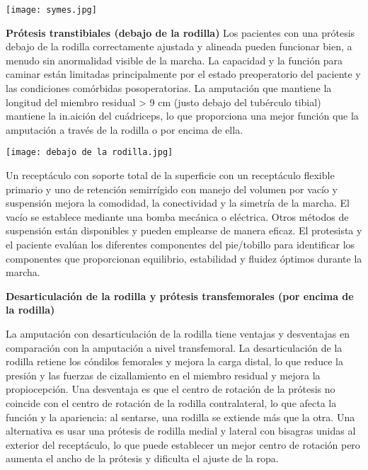 \documentclass{article}
\begin{document}
\begin{minipage}{.89\linewidth}
\centering
\texttt{[image: symes.jpg]}
\end{minipage}


\hspace{1cm}


\textbf {Prótesis transtibiales (debajo de la rodilla) }
Los pacientes con una prótesis debajo de la rodilla correctamente ajustada y alineada pueden funcionar bien, a menudo sin anormalidad visible de la marcha. La capacidad y la función para caminar están limitadas principalmente por el estado preoperatorio del paciente y las condiciones comórbidas posoperatorias. La amputación que mantiene la longitud del miembro residual > 9 cm (justo debajo del tubérculo tibial) mantiene la in.aición del cuádriceps, lo que proporciona una mejor función que la amputación a través de la rodilla o por encima de ella.

\hspace{1cm}


\begin{minipage}{.89\linewidth}
\centering
\texttt{[image: debajo de la rodilla.jpg]}
\end{minipage}

\hspace{1cm}

Un receptáculo con soporte total de la superficie con un receptáculo flexible primario y uno de retención semirrígido con manejo del volumen por vacío y suspensión mejora la comodidad, la conectividad y la simetría de la marcha. El vacío se establece mediante una bomba mecánica o eléctrica. Otros métodos de suspensión están disponibles y pueden emplearse de manera eficaz. El protesista y el paciente evalúan los diferentes componentes del pie/tobillo para identificar los componentes que proporcionan equilibrio, estabilidad y fluidez óptimos durante la marcha.


\hspace{1cm}


\textbf {Desarticulación de la rodilla y prótesis transfemorales (por encima de la rodilla) }

La amputación con desarticulación de la rodilla tiene ventajas y desventajas en comparación con la amputación a nivel transfemoral. La desarticulación de la rodilla retiene los cóndilos femorales y mejora la carga distal, lo que reduce la presión y las fuerzas de cizallamiento en el miembro residual y mejora la propiocepción. Una desventaja es que el centro de rotación de la prótesis no coincide con el centro de rotación de la rodilla contralateral, lo que afecta la función y la apariencia: al sentarse, una rodilla se extiende más que la otra. Una alternativa es usar una prótesis de rodilla medial y lateral con bisagras unidas al exterior del receptáculo, lo que puede establecer un mejor centro de rotación pero aumenta el ancho de la prótesis y dificulta el ajuste de la ropa.
\end{document}

